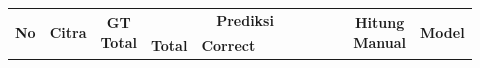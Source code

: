     

\begin{landscape}
\renewcommand{\arraystretch}{1.2} %
\centering 
\begin{longtable}{|c|c|c|c|c|c|c|c|c|c|c|c|c|}
    \hline
    \multirow{2}{*}{\parbox{0.375cm}{\centering\textbf{No}}} & 
    \multirow{2}{*}{\parbox{4.0cm}{\centering\textbf{Citra}}} & 
    \multirow{2}{*}{\parbox{0.75cm}{\centering\textbf{GT\\Total}}} & 
    \multicolumn{8}{c|}{\textbf{Prediksi}} &
    \multirow{2}{*}{\parbox{1.2cm}{\centering\textbf{Hitung\\Manual}}} &
    \multirow{2}{*}{\parbox{0.85cm}{\centering\textbf{Model}}} \\
    \cline{4-11}
    & & &
    \parbox{0.75cm}{\centering\textbf{Total}} &
    \parbox{1.1cm}{\centering\textbf{Correct}} &
    \parbox{0.7cm}{\centering\textbf{}} &
    \parbox{0.95cm}{\centering\textbf{}} &
    \parbox{0.7cm}{\centering\textbf{}} &
    \parbox{0.7cm}{\centering\textbf{}} &
    \parbox{0.95cm}{\centering\textbf{}} &
    \parbox{0.95cm}{\centering\textbf{}} &
    & \\

    \hline
    \endfirsthead
    

\end{longtable}
\end{landscape}
